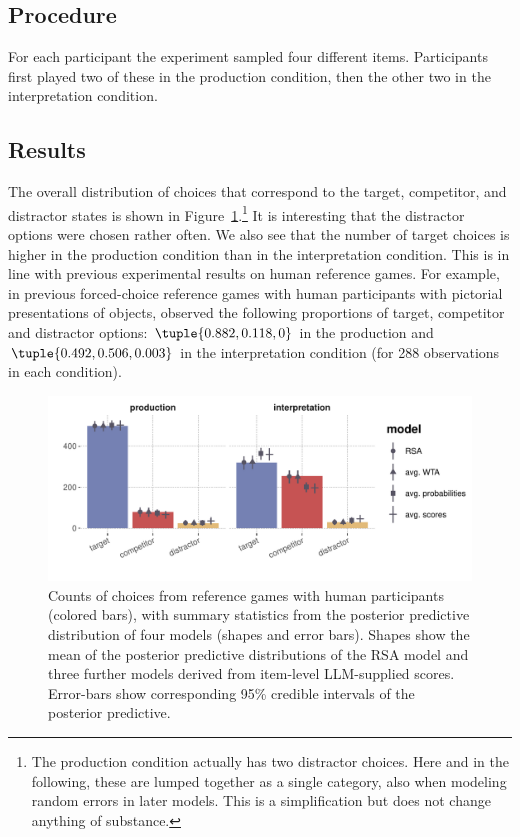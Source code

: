 \documentclass[fleqn]{article}
\begin{document}
\subsection{Procedure}
\label{procedure}

For each participant the experiment sampled four different items.
Participants first played two of these in the production condition, then the other two in the interpretation condition.


\subsection{Results}\label{results}

The overall distribution of choices that correspond to the target, competitor, and distractor states is shown in Figure~\ref{fig:refgame-counts}.\footnote{
  The production condition actually has two distractor choices.
  Here and in the following, these are lumped together as a single category, also when modeling random errors in later models.
  This is a simplification but does not change anything of substance.}
It is interesting that the distractor options were chosen rather often.
We also see that the number of target choices is higher in the production condition than in the interpretation condition.
This is in line with previous experimental results on human reference games.
For example, in previous forced-choice reference games with human participants with pictorial presentations of objects, \citet{QingFranke2013:Variations-on-a} observed the following proportions of target, competitor and distractor options: $\tuple{0.882, 0.118, 0}$ in the production and $\tuple{0.492, 0.506, 0.003}$ in the interpretation condition (for 288 observations in each condition).

\begin{figure}[t]
  \centering

    \includegraphics[width=0.9\linewidth]{00-pics/PPC-alpha-eps-model.pdf}

    \caption{Counts of choices from reference games with human participants (colored bars), with summary statistics from the posterior predictive distribution of four models (shapes and error bars).
      Shapes show the mean of the posterior predictive distributions of the RSA model and three further models derived from item-level LLM-supplied scores.
      Error-bars show corresponding 95\% credible intervals of the posterior predictive.
    }
  \label{fig:refgame-counts}
\end{figure}
\end{document}
